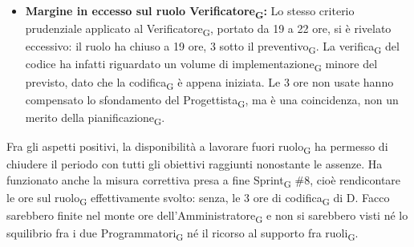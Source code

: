 ﻿\documentclass[a4paper, 10pt, colorlinks=true, linkcolor=black, urlcolor=blue, citecolor=blue, hidelinks]{article}
\begin{document}
\begin{itemize}
    \item \textbf{Margine in eccesso sul ruolo Verificatore\textsubscript{G}:} Lo stesso criterio prudenziale applicato al Verificatore\textsubscript{G}, portato da 19 a 22 ore, si è rivelato eccessivo: il ruolo ha chiuso a 19 ore, 3 sotto il preventivo\textsubscript{G}. La verifica\textsubscript{G} del codice ha infatti riguardato un volume di implementazione\textsubscript{G} minore del previsto, dato che la codifica\textsubscript{G} è appena iniziata. Le 3 ore non usate hanno compensato lo sfondamento del Progettista\textsubscript{G}, ma è una coincidenza, non un merito della pianificazione\textsubscript{G}.
\end{itemize}
Fra gli aspetti positivi, la disponibilità a lavorare fuori ruolo\textsubscript{G} ha permesso di chiudere il periodo con tutti gli obiettivi raggiunti nonostante le assenze. Ha funzionato anche la misura correttiva presa a fine Sprint\textsubscript{G} \#8, cioè rendicontare le ore sul ruolo\textsubscript{G} effettivamente svolto: senza, le 3 ore di codifica\textsubscript{G} di D. Facco sarebbero finite nel monte ore dell'Amministratore\textsubscript{G} e non si sarebbero visti né lo squilibrio fra i due Programmatori\textsubscript{G} né il ricorso al supporto fra ruoli\textsubscript{G}.
\end{document}
